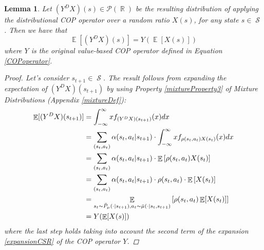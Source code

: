 \documentclass[12pt,a4paper,openright,twoside]{article}
\DeclareMathOperator*{\E}{\mathbb{E}}
\DeclareMathOperator*{\R}{\mathbb{R}}
\DeclareMathOperator*{\Sspace}{\mathcal{S}}
\numberwithin{equation}{section}
\newtheorem{lemma}[theorem]{Lemma}
\theoremstyle{definition}
\theoremstyle{remark}
\theoremstyle{plain}
\begin{document}
\begin{lemma} \label{expectationDistCOPoperator}
	Let $(Y^D X)(s)\in \mathscr{P}(\R)$ be the resulting distribution of applying the distributional COP operator over a random ratio $X(s)$, for any state $s \in \Sspace$. Then we have that
	\begin{equation*}
		\E [(Y^D X)(s) ] = Y (\E [X(s)])
	\end{equation*}
	where $Y$ is the original value-based COP operator defined in Equation \ref{COPoperator}.%
	
\begin{proof}
Let's consider $s_{t+1} \in \Sspace$. The result follows from expanding the expectation of $(Y^DX)(s_{t+1})$ by using Property \ref{mixtureProperty3} of Mixture Distributions (Appendix \ref{mixtureDef}):
\begin{equation} \label{expDistCOP}
\begin{split}
    \E[(Y^DX)(s_{t+1})] &= \int_{-\infty}^{\infty} x f_{(Y^DX)(s_{t+1})}(x) dx \\
    &= \sum_{(s_{t},a_{t})} \alpha(s_{t},a_{t}|s_{t+1}) \cdot \int_{-\infty}^{\infty} x f_{\rho(s_{t},a_{t}) X(s_{t})}(x) dx \\
    &= \sum_{(s_{t},a_{t})} \alpha(s_{t},a_{t}|s_{t+1}) \cdot \E \left[ \rho(s_{t},a_{t}) X(s_{t}) \right] \\
    &=  \sum_{(s_{t},a_{t})} \alpha(s_{t},a_{t}|s_{t+1}) \cdot \rho(s_{t},a_{t}) \cdot \E \left[X(s_{t}) \right]  \\
    &= \E_{s_t \sim \Bar{P}_\mu (\cdot | s_{t+1}), a_t \sim \Bar{\mu}(\cdot|s_t,s_{t+1})} \left[ \rho(s_{t},a_{t}) \E[X(s_t)] \right] \\
    &= Y (\E [X(s)])
\end{split}
\end{equation}
where the last step holds taking into account the second term of the expansion \ref{expansionCSR} of the COP operator $Y$.

\end{proof}
\end{lemma}
\end{document}
